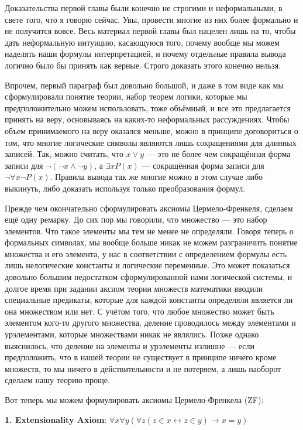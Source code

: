 Доказательства первой главы были конечно не строгими и неформальными, в свете того, что я говорю сейчас. Увы, провести многие из них более формально и не получится вовсе. Весь материал первой главы был нацелен лишь на то, чтобы дать неформальную интуицию, касающуюся того, почему вообще мы можем наделять наши формулы интерпретацией, и почему отдельные правила вывода логично было бы принять как верные. Строго доказать этого конечно нельзя.

Впрочем, первый параграф был довольно большой, и даже в том виде как мы сформулировали понятие теории, набор теорем логики, которые мы предположительно можем использовать, тоже объёмный, и все это предлагается принять на веру, основываясь на каких-то неформальных рассуждениях. Чтобы объем принимаемого на веру оказался меньше, можно в принципе договориться о том, что многие логические символы являются лишь сокращениями для длинных записей. Так, можно считать, что $x\vee y$ — это не более чем сокращённая форма записи для $\neg (\neg x \wedge \neg y)$, а $\exists x P(x)$ — сокращённая форма записи для $\neg \forall x \neg P(x)$. Правила вывода так же многие можно в этом случае либо выкинуть, либо доказать используя только преобразования формул.

Прежде чем окончательно сформулировать аксиомы Цермело-Френкеля, сделаем ещё одну ремарку. До сих пор мы говорили, что множество — это набор элементов. Что такое элементы мы тем не менее не определяли. Говоря теперь о формальных символах, мы вообще больше никак не можем разграничить понятие множества и его элемента, у нас в соответствии с определением формулы есть лишь нелогические константы и логические переменные. Это может показаться довольно большим недостатком сформулированной нами логической системы, и долгое время при задании аксиом теории множеств математики вводили специальные предикаты, которые для каждой константы определяли является ли она множеством или нет. С учётом того, что любое множество может быть элементом кого-то другого множества, деление проводилось между элементами и урэлементами, которые множествами никак не являлись. Позже однако выяснилось, что деление на элементы и урэлементы излишне — если предположить, что в нашей теории не существует в принципе ничего кроме множеств, то мы ничего в действительности и не потеряем, а лишь наоборот сделаем нашу теорию проще.

Вот теперь мы можем формулировать аксиомы Цермело-Френкела (ZF):

{\bfseries 1. Extensionality Axiom}: $\forall x \forall y (\forall z (z \in x \leftrightarrow z \in y) \rightarrow x = y)$

